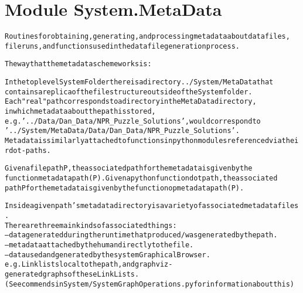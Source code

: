 %
%
%


\section{Module System.MetaData}

    \label{System:MetaData}
\begin{alltt}

Routines for obtaining, generating, and processing meta data about data files, 
file runs, and functions used in the data file generation process. 

The way that the metadata scheme works is:

In the top level System Folder there is a directory ../System/MetaData that 
contains a replica of the file structure outside of the System folder.   
Each "real" path corresponds to a directory in the MetaData directory,
in which metadata about the path is stored, 
e.g. '../Data/Dan\_Data/NPR\_Puzzle\_Solutions', would correspond to 
'../System/MetaData/Data/Dan\_Data/NPR\_Puzzle\_Solutions'.   
Metadata is similarly attached to functions in python modules referenced via their dot-paths.   
        
Given a file path P, the associated path for the metadata is given by the 
function metadatapath(P).  Given a python function dot path, the associated 
path P for the metadata is given by the function opmetadatapath(P).   

Inside a given path's metadata directory is a variety of associated metadata files. 
There are three main kinds of associated things:
        -- data generated during the runtime that produced/was generated by the path. 
        -- metadata attached by the human directly to the file.  
        -- data used and generated by the system Graphical Browser.  
        e.g. Linklists local to the path, and graphviz-generated graphs of these LinkLists.  
        (See commends in System/SystemGraphOperations.py for information about this) 
        
\end{alltt}



